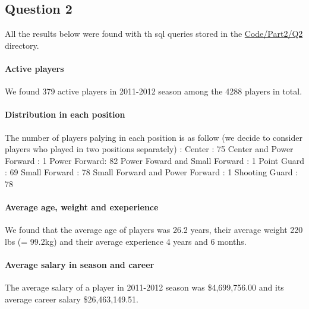 
\subsection{Question 2}
\label{subsec:412}
All the results below were found with th sql queries stored in the \url{Code/Part2/Q2} directory.
\paragraph{Active players}We found 379 active players in 2011-2012 season among the 4288 players in total.

\paragraph{Distribution in each position}
 The number of players palying in each position is as follow (we decide to consider players who played in two positions separately) :
 Center : 75
 Center and Power Forward : 1
 Power Forward: 82
 Power Foward and Small Forward : 1
 Point Guard : 69
 Small Forward : 78
 Small Forward and Power Forward : 1
 Shooting Guard : 78

\paragraph{Average age, weight and exeperience}
We found that the average age of players was 26.2 years, their average weight 220 lbs (= 99.2kg) and their average experience 4 years and 6 months.

\paragraph{Average salary in season and career}
The average salary of a player in 2011-2012 season was \$4,699,756.00 and its average career salary \$26,463,149.51.
